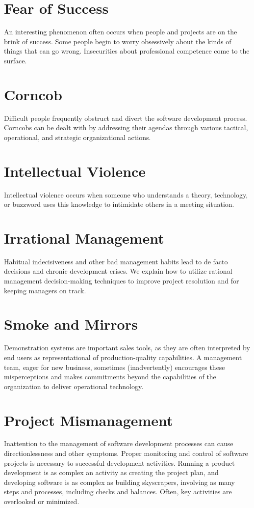 \documentclass{book}
\begin{document}
\chapter{Fear of Success}
An interesting phenomenon often occurs when people and projects are on the brink of success.
Some people begin to worry obsessively about the kinds of things that can go wrong. Insecurities about professional competence come to the surface.
\chapter{Corncob}
Difficult people frequently obstruct and divert the software development process.
Corncobs can be dealt with by addressing their agendas through various tactical, operational, and strategic organizational actions.
\chapter{Intellectual Violence}
Intellectual violence occurs when someone who understands a theory, technology, or buzzword uses this knowledge to intimidate others in a meeting situation.
\chapter{Irrational Management}
Habitual indecisiveness and other bad management habits lead to de facto decisions and chronic development crises.
We explain how to utilize rational management decision-making techniques to improve project resolution and for keeping managers on track.
\chapter{Smoke and Mirrors}
Demonstration systems are important sales tools, as they are often interpreted by end users as representational of production-quality capabilities.
A management team, eager for new business, sometimes (inadvertently) encourages these misperceptions and makes commitments beyond the capabilities of the organization to deliver operational technology.
\chapter{Project Mismanagement}
Inattention to the management of software development processes can cause directionlessness and other symptoms.
Proper monitoring and control of software projects is necessary to successful development activities.
Running a product development is as complex an activity as creating the project plan,
and developing software is as complex as building skyscrapers, involving as many steps and processes, including checks and balances. Often, key activities are overlooked or minimized.
\end{document}
